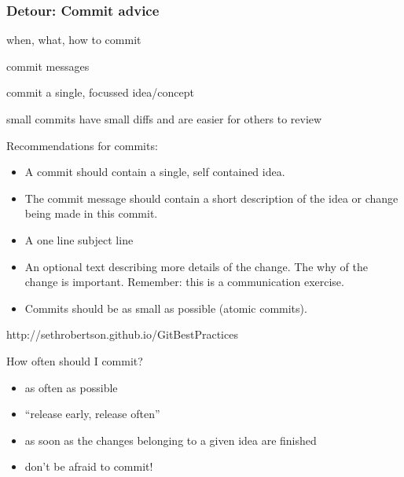 \begin{frame}
\frametitle{Detour: Commit advice}

when, what, how to commit

commit messages

commit a single, focussed idea/concept

small commits have small diffs and are easier for others to review

Recommendations for commits:

\begin{itemize}
    \item A commit should contain a single, self contained idea.
    \item The commit message should contain a short description
        of the idea or change being made in this commit.
    \item A one line subject line
    \item An optional text describing more details of the change. The
        why of the change is important. Remember: this is a
        communication exercise.
    \item Commits should be as small as possible (atomic commits).
\end{itemize}

    http://sethrobertson.github.io/GitBestPractices

How often should I commit?
\begin{itemize}
    \item as often as possible
    \item “release early, release often”
    \item as soon as the changes belonging to a given idea are
        ﬁnished
    \item don’t be afraid to commit!
\end{itemize}

\end{frame}

